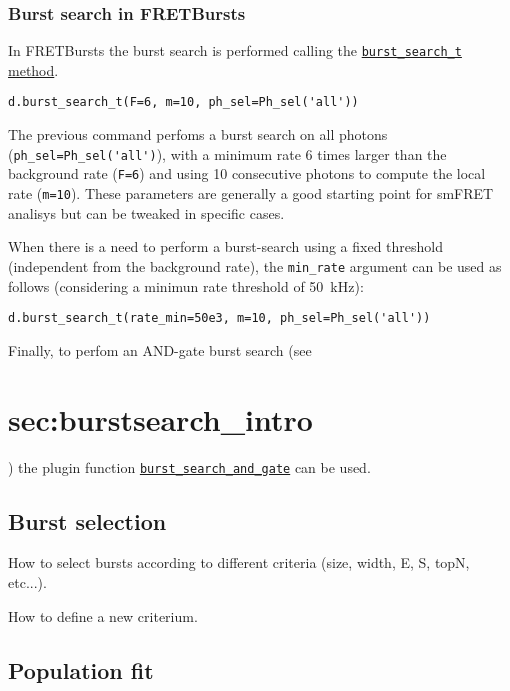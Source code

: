 \subsubsection{Burst search in FRETBursts}
\label{sec:burstsearch_intro}

In FRETBursts the burst search is performed calling the \href{http://fretbursts.readthedocs.org/en/latest/data_class.html#fretbursts.burstlib.Data.burst_search_t}{\verb|burst_search_t| method}.

\begin{verbatim}
d.burst_search_t(F=6, m=10, ph_sel=Ph_sel('all'))
\end{verbatim}

The previous command perfoms a burst search on all photons (\verb|ph_sel=Ph_sel('all')|), with a minimum rate 6 times larger than the background rate (\verb|F=6|) and using 10 consecutive photons to compute the local rate (\verb|m=10|).
These parameters are generally a good starting point for smFRET analisys but can be tweaked in specific cases.

When there is a need to perform a burst-search using a fixed threshold (independent from the background rate), 
the \verb|min_rate| argument can be used as follows (considering a minimun rate threshold of 50~kHz):

\begin{verbatim}
d.burst_search_t(rate_min=50e3, m=10, ph_sel=Ph_sel('all'))
\end{verbatim}

Finally, to perfom an AND-gate burst search (see~\section{sec:burstsearch_intro}) the plugin function \href{http://fretbursts.readthedocs.org/en/latest/plugins.html#fretbursts.burstlib_ext.burst_search_and_gate}{\verb|burst_search_and_gate|} can be used.

\subsection{Burst selection}

How to select bursts according to different criteria (size, width, E, S, topN, etc...).

How to define a new criterium.


\subsection{Population fit}

